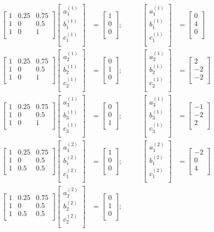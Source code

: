 \documentclass[12pt]{article}
\newcommand{\aoneonematrix}{
  \begin{bmatrix}
    1 & 0.25 & 0.75 \\
    1 & 0    & 0.5 \\
    1 & 0    & 1 \\
  \end{bmatrix}
}
\newcommand{\aonetwomatrix}{
  \begin{bmatrix}
    1 & 0.25 & 0.75 \\
    1 & 0    & 0.5  \\
    1 & 0.5  & 0.5  \\
  \end{bmatrix}
}
\newcommand{\bonematrix}[2]{
  \begin{bmatrix}
    a_{#1}^{(#2)} \\
    b_{#1}^{(#2)} \\
    c_{#1}^{(#2)} \\
  \end{bmatrix}
}
\newcommand{\setupaonematrices}[2]{
\aoneonematrix \bonematrix{#1}{#2}
}
\newcommand{\setupatwomatrices}[2]{
\aonetwomatrix \bonematrix{#1}{#2}
}
\begin{document}
\begin{equation}
  \label{eq:1_A_array}
  \begin{aligned}
    \setupaonematrices{1}{1}&
    = \begin{bmatrix} 1\\0\\0\\\end{bmatrix};
    &\qquad\bonematrix{1}{1} &= \begin{bmatrix}0\\4\\0\\\end{bmatrix}\\
    \setupaonematrices{2}{1}&
    = \begin{bmatrix} 0\\1\\0\\\end{bmatrix};
    &\qquad\bonematrix{2}{1} &= \begin{bmatrix}2\\-2\\-2\\\end{bmatrix}\\
    \setupaonematrices{3}{1}&
    = \begin{bmatrix} 0\\0\\1\\\end{bmatrix};
    &\qquad\bonematrix{3}{1} &= \begin{bmatrix}-1\\-2\\2\\\end{bmatrix}\\
    \setupatwomatrices{1}{2}&
    = \begin{bmatrix} 1\\0\\0\\\end{bmatrix};
    &\qquad\bonematrix{1}{2} &= \begin{bmatrix}-2\\0\\4\\\end{bmatrix}\\
    \setupatwomatrices{2}{2}&
    = \begin{bmatrix} 0\\1\\0\\\end{bmatrix};

\end{aligned}
\end{equation}
\end{document}
